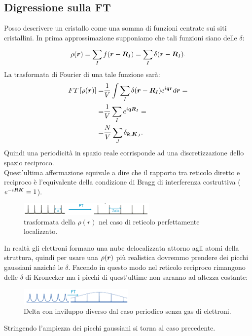 \subsection{Digressione sulla FT}
\label{subsec:Digressione sulla FT}
Posso descrivere un cristallo come una somma di funzioni centrate sui siti cristallini. In prima approssimazione supponiamo che tali funzioni siano delle $\delta$:
\[
	\rho (\boldsymbol{r}) = \sum_{I}^{} f(\boldsymbol{r}-\boldsymbol{R}_I) = \sum_{I}^{} \delta(\boldsymbol{r}-\boldsymbol{R}_I)
.\] 
La trasformata di Fourier di una tale funzione sarà:
\[\begin{aligned}
	FT\left[ \rho (\boldsymbol{r}) \right] 
	=&
	\frac{1}{V}\int \sum_{I}^{} \delta(\boldsymbol{r}-\boldsymbol{R}_I)e^{i \boldsymbol{q}\boldsymbol{r}}d \boldsymbol{r} =\\
	=&
	\frac{1}{V}\sum_{I}^{} e^{i \boldsymbol{q}\boldsymbol{R}_I} =\\
	=&
	\frac{N}{V}\sum_{J}^{} \delta_{\boldsymbol{k},\boldsymbol{K}_J}
.\end{aligned}\]
Quindi una periodicità in spazio reale corrisponde ad una discretizzazione dello spazio reciproco. \\
Quest'ultima affermazione equivale a dire che il rapporto tra reticolo diretto e reciproco è l'equivalente della condizione di Bragg di interferenza costruttiva ($e^{-i \boldsymbol{R}\boldsymbol{K}} = 1$).
\begin{figure}[H]
	\centering
	\includegraphics[width=0.6\textwidth]{figures/reticolo-localizzato.png}
	\caption{trasformata della $\rho (r)$ nel caso di reticolo perfettamente localizzato.}
	\label{fig:}
\end{figure}
\noindent
In realtà gli elettroni formano una nube delocalizzata attorno agli atomi della struttura, quindi per usare una $\rho (\boldsymbol{r})$ più realistica dovremmo prendere dei picchi gaussiani anziché le $\delta$. Facendo in questo modo nel reticolo reciproco rimangono delle $\delta$ di Kronecker ma i picchi di quest'ultime non saranno ad altezza costante:
\begin{figure}[H]
	\centering
	\includegraphics[width=0.5\textwidth]{figures/delta-smussate.png}
	\caption{Delta con inviluppo diverso dal caso periodico senza gas di elettroni.}
	\label{fig:fi}
\end{figure}
\noindent
Stringendo l'ampiezza dei picchi gaussiani si torna al caso precedente.
